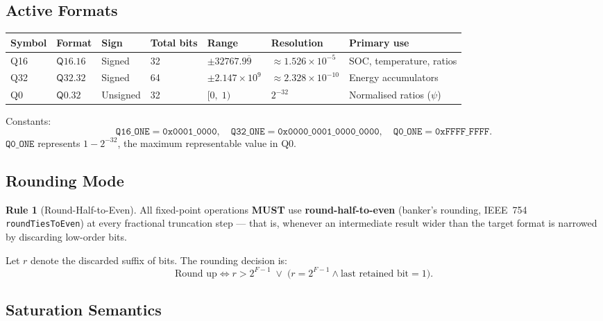 \documentclass[11pt,letterpaper]{article}
\theoremstyle{definition}
\newtheorem{specrule}{Rule}[section]
\newcommand{\MUST}{\textbf{MUST}}
\newcommand{\Qfmt}[2]{\ensuremath{\mathsf{Q}#1.#2}}   %
\newcommand{\qval}[1]{\ensuremath{\mathtt{#1}}}        %
\newcommand{\sy}{\psi}          %
\begin{document}
\subsection{Active Formats}
\label{sec:formats}

\begin{center}
\begin{tabular}{lllllll}
\toprule
\textbf{Symbol} & \textbf{Format} & \textbf{Sign} & \textbf{Total bits} & \textbf{Range} & \textbf{Resolution} & \textbf{Primary use} \\
\midrule
Q16 & $\Qfmt{16}{16}$ & Signed & 32 & $\pm 32767.9\overline{9}$ & $\approx 1.526 \times 10^{-5}$ & SOC, temperature, ratios \\
Q32 & $\Qfmt{32}{32}$ & Signed & 64 & $\pm 2.147 \times 10^9$ & $\approx 2.328 \times 10^{-10}$ & Energy accumulators \\
Q0  & $\Qfmt{0}{32}$  & Unsigned & 32 & $[0,\;1)$ & $2^{-32}$ & Normalised ratios ($\sy$) \\
\bottomrule
\end{tabular}
\end{center}

\noindent Constants:
\[
    \qval{Q16\_ONE} = \mathtt{0x0001\_0000}, \quad
    \qval{Q32\_ONE} = \mathtt{0x0000\_0001\_0000\_0000}, \quad
    \qval{Q0\_ONE}  = \mathtt{0xFFFF\_FFFF}.
\]
$\qval{Q0\_ONE}$ represents $1 - 2^{-32}$, the maximum representable value in Q0.

\subsection{Rounding Mode}
\label{sec:rounding}

\begin{specrule}[Round-Half-to-Even]
\label{rule:rounding}
All fixed-point operations \MUST{} use \textbf{round-half-to-even} (banker's rounding, IEEE~754 \texttt{roundTiesToEven}) at every fractional truncation step — that is, whenever an intermediate result wider than the target format is narrowed by discarding low-order bits.

Let $r$ denote the discarded suffix of bits. The rounding decision is:
\[
    \text{Round up} \iff r > 2^{F-1} \;\vee\; \bigl(r = 2^{F-1} \wedge \text{last retained bit} = 1\bigr).
\]
\end{specrule}

\subsection{Saturation Semantics}
\label{sec:saturation}
\end{document}
